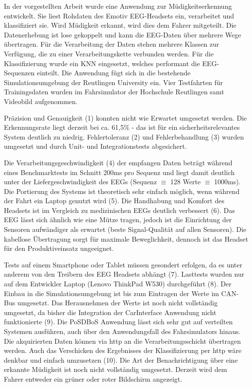 \label{chap:result}
In der vorgestellten Arbeit wurde eine Anwendung zur Müdigkeitserkennung entwickelt. Sie liest Rohdaten des Emotiv EEG-Headsets ein, verarbeitet und klassifiziert sie. Wird Müdigkeit erkannt, wird dies dem Fahrer mitgeteilt. 
Die Datenerhebung ist lose gekoppelt und kann die EEG-Daten über mehrere Wege übertragen. Für die Verarbeitung der Daten stehen mehrere Klassen zur Verfügung, die zu einer Verarbeitungskette verbunden werden. Für die Klassifizierung wurde ein KNN eingesetzt, welches performant die EEG-Sequenzen einteilt. Die Anwendung fügt sich in die bestehende Simulationsumgebung der Reutlingen University ein. Vier Testfahrten für Trainingsdaten wurden im Fahrsimulator der Hochschule Reutlingen samt Videobild aufgenommen.

Präzision und Genauigkeit (1) konnten nicht wie Erwartet umgesetzt werden. Die Erkennungsrate liegt derzeit bei ca. 61,5\% - das ist für ein sicherheitsrelevantes System deutlich zu niedrig. 
Fehlertoleranz (2) und Fehlerbehandlung (3) wurden umgesetzt und durch Unit- und Integrationstests abgesichert. 

Die Verarbeitungsgeschwindigkeit (4) der empfangen Daten beträgt  während eines Benchmarktests im Schnitt 200ms pro Sequenz und liegt damit deutlich unter der Liefergeschwindigkeit des EEGs (Sequenz $\equiv$ 128 Werte $\equiv$ 1000ms). 
Die Portierung des Systems ist theoretisch sehr einfach möglich, wenn während der Fahrt ein Laptop genutzt wird (5). Die Handhabung und Komfort des Headsets ist im Vergleich zu medizinischen EEGs deutlich verbessert (6). Das EEG lässt sich ähnlich wie eine Mütze tragen, jedoch ist die Einrichtung der Sensoren aufwändiger als erwartet (beste Signal-Qualität auf allen Sensoren). Die kabellose Übertragung sorgt für maximale Beweglichkeit, dennoch ist das Headset für den Produktiveinsatz ungeeignet.

Tests auf einem Smartphone oder Tablet müssen gesondert erfolgen, da es unter anderem von den Treibern des EEG Headsets abhängt (7). Lasttests wurden nur auf dem Entwickler Laptop (Lenovo ThinkPad W530) durchgeführt (8). Der Einbau in die Simulationsumgebung ist bis zum Eintragen der Werte im CAN-Bus umgesetzt. Das Herausnehmen der Werte ist noch nicht vollständig umgesetzt, da bisher die Integration der CarInterface Anwendung nicht funktionierte (9). Die PoSDBoS Anwendung lässt sich sehr gut auf verteilten Systemen ausführen, auch über den Anwendungsfall des Fahrsimulators hinaus. Die akquirierten Daten können via http an die Verarbeitungsschicht übertragen werden. Auch das Verschicken des Ergebnisses der Klassifizierung per http wäre denkbar und einfach umzusetzen (10). Die Art der Benachrichtigung über eine erkannte Müdigkeit ist noch nicht vollständig umgesetzt. Derzeit wird dem Fahrer entweder ein grüner oder roter Bildschirm angezeigt.

